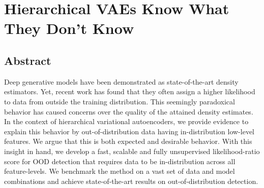 \chapter[hierarchical vaes know what they don't know]{Hierarchical VAEs Know What They Don't Know}
\label{chp:hierarchical}

\section*{Abstract}
Deep generative models have been demonstrated as state-of-the-art density estimators.
Yet, recent work has found that they often assign a higher likelihood to data from outside the training distribution.
This seemingly paradoxical behavior has caused concerns over the quality of the attained density estimates.
In the context of hierarchical variational autoencoders, we provide evidence to explain this behavior by out-of-distribution data having in-distribution low-level features.
We argue that this is both expected and desirable behavior.
With this insight in hand, we develop a fast, scalable and fully unsupervised likelihood-ratio score for OOD detection that requires data to be in-distribution across all feature-levels.
We benchmark the method on a vast set of data and model combinations and achieve state-of-the-art results on out-of-distribution detection.


